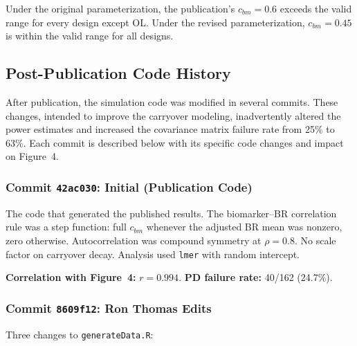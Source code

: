 \documentclass[11pt]{article}
\begin{document}
Under the original parameterization, the publication's
$c_{bm} = 0.6$ exceeds the valid range for every design
except OL. Under the revised parameterization,
$c_{bm} = 0.45$ is within the valid range for all designs.

\subsection{Post-Publication Code History}

After publication, the simulation code was modified in
several commits. These changes, intended to improve the
carryover modeling, inadvertently altered the power
estimates and increased the covariance matrix failure rate
from 25\% to 63\%. Each commit is described below with
its specific code changes and impact on Figure~4.

\subsubsection{Commit \texttt{42ac030}: Initial
              (Publication Code)}

The code that generated the published results. The
biomarker--BR correlation rule was a step function: full
$c_{bm}$ whenever the adjusted BR mean was nonzero, zero
otherwise. Autocorrelation was compound symmetry at
$\rho = 0.8$. No scale factor on carryover decay.
Analysis used \texttt{lmer} with random intercept.

\textbf{Correlation with Figure~4:} $r = 0.994$.
\textbf{PD failure rate:} 40/162 (24.7\%).

\subsubsection{Commit \texttt{8609f12}: Ron Thomas Edits}

Three changes to \texttt{generateData.R}:
\end{document}
